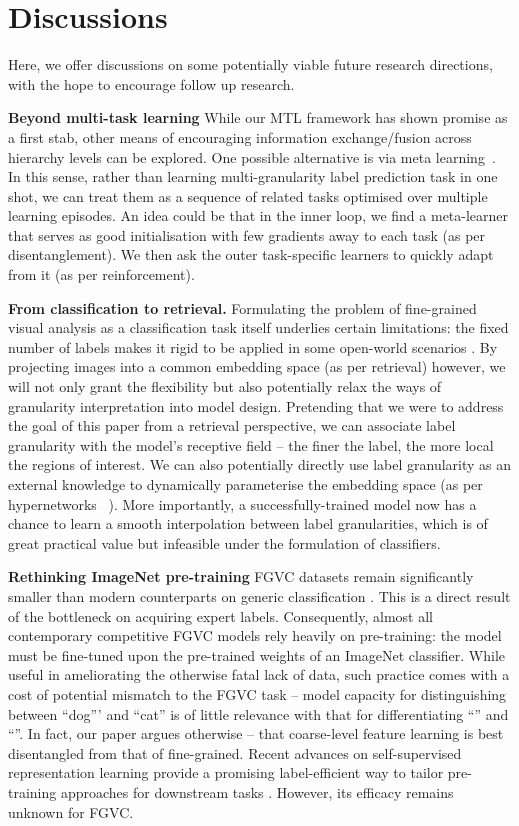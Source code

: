 \documentclass[final]{cvpr}
\newcommand{\keypoint}[1]{\vspace{0.05cm}\noindent\textbf{#1}\quad}
\begin{document}
\section{Discussions}
Here, we offer discussions on some potentially viable future research directions, with the hope to encourage follow up research. 

\keypoint{Beyond multi-task learning} While our MTL framework has shown promise as a first stab, other means of encouraging information exchange/fusion across hierarchy levels can be explored. One possible alternative is via meta learning~\cite{hospedales2020meta}. In this sense, rather than learning multi-granularity label prediction task in one shot, we can treat them as a sequence of related tasks optimised over multiple learning episodes. An idea could be that in the inner loop, we find a meta-learner that serves as good initialisation with few gradients away to each task (as per disentanglement). We then ask the outer task-specific learners to quickly adapt from it (as per reinforcement). 

\keypoint{From classification to retrieval.} Formulating the problem of fine-grained visual analysis as a classification task itself underlies certain limitations: the fixed number of labels makes it rigid to be applied in some open-world scenarios {\cite{wei2019deep}}. By projecting images into a common embedding space (as per retrieval) however, we will not only grant the flexibility but also potentially relax the ways of granularity interpretation into model design. Pretending that we were to address the goal of this paper from a retrieval perspective, we can associate label granularity with the model's receptive field -- the finer the label, the more local the regions of interest. We can also potentially directly use label granularity as an external knowledge to dynamically parameterise the embedding space (as per hypernetworks ~\cite{ha2016hypernetworks}). More importantly, a successfully-trained model now has a chance to learn a smooth interpolation between label granularities, which is of great practical value but infeasible under the formulation of classifiers. 

\keypoint{Rethinking ImageNet pre-training} FGVC datasets remain significantly smaller than modern counterparts on generic classification {\cite{deng2009imagenet,peng2019moment}}. This is a direct result of the bottleneck on acquiring expert labels. Consequently, almost all contemporary competitive FGVC models rely heavily on pre-training: the model must be fine-tuned upon the pre-trained weights of an ImageNet classifier. While useful in ameliorating the otherwise fatal lack of data, such practice comes with a cost of potential mismatch to the FGVC task -- model capacity for distinguishing between ``dog''' and ``cat'' is of little relevance with that for differentiating ``'' and ``''. In fact, our paper argues otherwise -- that coarse-level feature learning is best disentangled from that of fine-grained. Recent advances on self-supervised representation learning provide a promising label-efficient way to tailor pre-training approaches for downstream tasks {\cite{pang2020solving,tschannen2020self}}. However, its efficacy remains unknown for FGVC.
\end{document}
